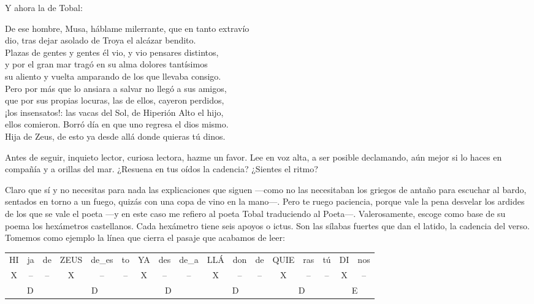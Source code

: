 Y ahora la de Tobal:

\begin{versocita}
De ese hombre, Musa, háblame milerrante, que en tanto extravío\\
dio, tras dejar asolado de Troya el alcázar bendito.\\
Plazas de gentes y gentes él vio, y vio pensares distintos,\\
y por el gran mar tragó en su alma dolores tantísimos\\
su aliento y vuelta amparando de los que llevaba consigo.\\
Pero por más que lo ansiara a salvar no llegó a sus amigos,\\
que por sus propias locuras, las de ellos, cayeron perdidos,\\
¡los insensatos!: las vacas del Sol, de Hiperión Alto el hijo,\\
ellos comieron. Borró día en que uno regresa el dios mismo.\\
Hija de Zeus, de esto ya desde allá donde quieras tú dinos.
\end{versocita}

Antes de seguir, inquieto lector, curiosa lectora, hazme un favor. Lee en voz alta, a ser posible declamando, aún mejor si lo haces en compañía y a orillas del mar. ¿Resuena en tus oídos la cadencia? ¿Sientes el ritmo?

Claro que sí y no necesitas para nada las explicaciones que siguen ---como no las necesitaban los griegos de antaño para escuchar al bardo, sentados en torno a un fuego, quizás con una copa de vino en la mano---. Pero te ruego paciencia, porque vale la pena desvelar los ardides de los que se vale el poeta ---y en este caso me refiero al poeta Tobal traduciendo al Poeta---. Valerosamente, escoge como base de su poema los hexámetros castellanos. Cada hexámetro tiene seis apoyos o ictus. Son las sílabas fuertes que dan el latido, la cadencia del verso. Tomemos como ejemplo la línea que cierra el pasaje que acabamos de leer:

\begin{center}
\small\setlength{\tabcolsep}{3pt}
\begin{tabular}{ccc|ccc|ccc|ccc|ccc|cc}
HI & ja & de & ZEUS & de\_es & to & YA & des & de\_a & LLÁ & don & de & QUIE & ras & tú & DI & nos \\
X & -- & -- & X & -- & -- & X & -- & -- & X & -- & -- & X & -- & -- & X & -- \\
\multicolumn{3}{c|}{D} & \multicolumn{3}{c|}{D} & \multicolumn{3}{c|}{D} & \multicolumn{3}{c|}{D} & \multicolumn{3}{c|}{D} & \multicolumn{2}{c}{E} \\
\end{tabular}
\end{center}

